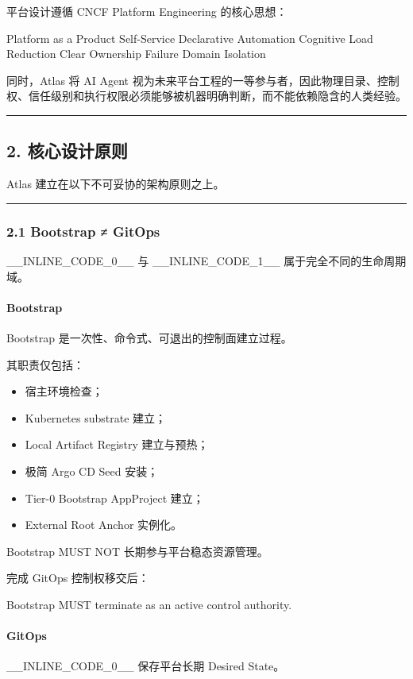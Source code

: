 \documentclass[11pt,a4paper]{article}
\begin{document}
平台设计遵循 CNCF Platform Engineering 的核心思想：

\begin{gfmBlockquote}
Platform as a Product
Self-Service
Declarative Automation
Cognitive Load Reduction
Clear Ownership
Failure Domain Isolation
\end{gfmBlockquote}
同时，Atlas 将 AI Agent 视为未来平台工程的一等参与者，因此物理目录、控制权、信任级别和执行权限必须能够被机器明确判断，而不能依赖隐含的人类经验。

\vspace{0.5em}\hrule\vspace{0.5em}
\subsection{2. 核心设计原则}
Atlas 建立在以下不可妥协的架构原则之上。

\vspace{0.5em}\hrule\vspace{0.5em}
\subsubsection{2.1 Bootstrap ≠ GitOps}
\_\_INLINE\_CODE\_0\_\_ 与 \_\_INLINE\_CODE\_1\_\_ 属于完全不同的生命周期域。

\paragraph{Bootstrap}
Bootstrap 是一次性、命令式、可退出的控制面建立过程。

其职责仅包括：

\begin{itemize}
  \item 宿主环境检查；
  \item Kubernetes substrate 建立；
  \item Local Artifact Registry 建立与预热；
  \item 极简 Argo CD Seed 安装；
  \item Tier-0 Bootstrap AppProject 建立；
  \item External Root Anchor 实例化。
\end{itemize}
Bootstrap MUST NOT 长期参与平台稳态资源管理。

完成 GitOps 控制权移交后：

\begin{gfmBlockquote}
Bootstrap MUST terminate as an active control authority.
\end{gfmBlockquote}
\paragraph{GitOps}
\_\_INLINE\_CODE\_0\_\_ 保存平台长期 Desired State。
\end{document}
